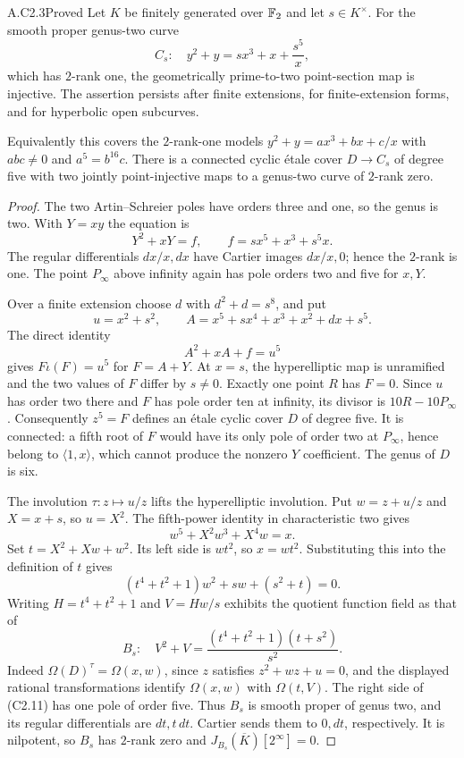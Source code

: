 \begin{claim}{A.C2.3}{Proved}
Let $K$ be finitely generated over $\mathbb F_2$ and let $s\in K^\times$.
For the smooth proper genus-two curve
\[
                 C_s:\quad y^2+y=sx^3+x+\frac{s^5}{x},       \tag{C2.9}
\]
which has $2$-rank one, the geometrically prime-to-two point-section
map is injective. The assertion persists after finite extensions,
for finite-extension forms, and for hyperbolic open subcurves.

Equivalently this covers the $2$-rank-one models
$y^2+y=a x^3+b x+c/x$ with $abc\ne0$ and $a^5=b^{16}c$.
There is a connected cyclic \'etale cover $D\to C_s$ of degree
five with two jointly point-injective maps to a genus-two curve
of $2$-rank zero.
\end{claim}
\begin{proof}
The two Artin--Schreier poles have orders three and one, so the
genus is two. With $Y=xy$ the equation is
\[
 Y^2+xY=f,\qquad f=sx^5+x^3+s^5x.
\]
The regular differentials $dx/x,dx$ have Cartier images $dx/x,0$;
hence the $2$-rank is one. The point $P_\infty$ above infinity
again has pole orders two and five for $x,Y$.

Over a finite extension choose $d$ with $d^2+d=s^8$, and put
\[
 u=x^2+s^2,\qquad
 A=x^5+s x^4+x^3+x^2+d x+s^5.
\]
The direct identity
\[
                        A^2+xA+f=u^5                        \tag{C2.10}
\]
gives $F\iota(F)=u^5$ for $F=A+Y$.
At $x=s$, the hyperelliptic map is unramified and the two values
of $F$ differ by $s\ne0$. Exactly one point $R$ has $F=0$.
Since $u$ has order two there and $F$ has pole order ten at
infinity, its divisor is $10R-10P_\infty$. Consequently
$z^5=F$ defines an \'etale cyclic cover $D$ of degree five.
It is connected: a fifth root of $F$ would have its only pole of
order two at $P_\infty$, hence belong to $\langle1,x\rangle$,
which cannot produce the nonzero $Y$ coefficient. The genus of
$D$ is six.

The involution $\tau:z\mapsto u/z$ lifts the hyperelliptic
involution. Put $w=z+u/z$ and $X=x+s$, so $u=X^2$. The
fifth-power identity in characteristic two gives
\[
 w^5+X^2w^3+X^4w=x.
\]
Set $t=X^2+Xw+w^2$. Its left side is $w t^2$, so $x=w t^2$.
Substituting this into the definition of $t$ gives
\[
 (t^4+t^2+1)w^2+s w+(s^2+t)=0.
\]
Writing $H=t^4+t^2+1$ and $V=Hw/s$ exhibits the quotient
function field as that of
\[
 B_s:\quad V^2+V=\frac{(t^4+t^2+1)(t+s^2)}{s^2}.             \tag{C2.11}
\]
Indeed $\Omega(D)^\tau=\Omega(x,w)$, since $z$ satisfies
$z^2+wz+u=0$, and the displayed rational transformations identify
$\Omega(x,w)$ with $\Omega(t,V)$. The right side of (C2.11) has
one pole of order five. Thus $B_s$ is smooth proper of genus two,
and its regular differentials are $dt,t\,dt$. Cartier sends them
to $0,dt$, respectively. It is nilpotent, so $B_s$ has $2$-rank
zero and $J_{B_s}(\overline K)[2^\infty]=0$.


\end{proof}
